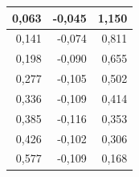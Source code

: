 \documentclass[a4paper,12pt]{article}
\begin{document}
\begin{enumerate}
\begin{table}[h!]
\begin{tabular}{|r|r|r|}
0,063                                              & -0,045                                                                                             & 1,150                                                                                                                       \\ \hline
0,141                                              & -0,074                                                                                             & 0,811                                                                                                                      \\ \hline
0,198                                              & -0,090                                                                                              & 0,655                                                                                                                      \\ \hline
0,277                                              & -0,105                                                                                             & 0,502                                                                                                                      \\ \hline
0,336                                              & -0,109                                                                                             & 0,414                                                                                                                      \\ \hline
0,385                                              & -0,116                                                                                             & 0,353                                                                                                                      \\ \hline
0,426                                              & -0,102                                                                                             & 0,306                                                                                                                      \\ \hline
0,577                                              & -0,109                                                                                             & 0,168                                                                                                                      \\ \hline

\end{tabular}
\end{table}
\end{enumerate}
\end{document}
